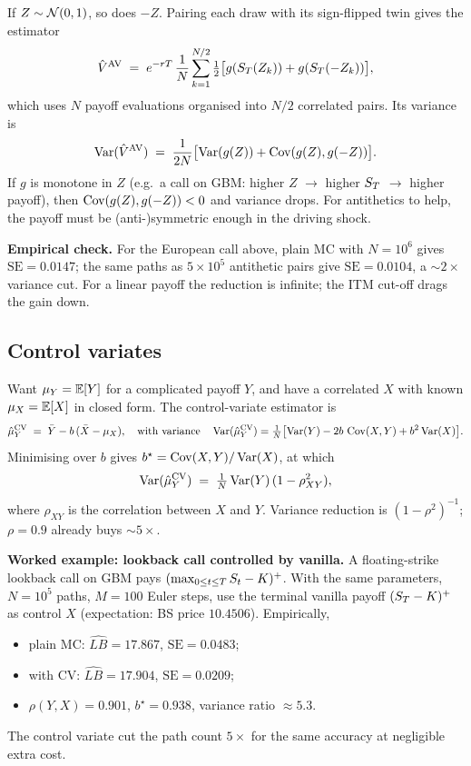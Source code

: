 If $Z \sim \mathcal{N}(0,1)$, so does $-Z$.  Pairing each draw with its
sign-flipped twin gives the estimator
\begin{equation}
  \hat V^{\mathrm{AV}}
  \;=\; e^{-rT}\,
        \frac{1}{N} \sum_{k=1}^{N/2}
        \tfrac12 \bigl[ g(S_T(Z_k)) + g(S_T(-Z_k)) \bigr],
\end{equation}
which uses $N$ payoff evaluations organised into $N/2$ correlated
pairs.  Its variance is
\begin{equation}
  \operatorname{Var}(\hat V^{\mathrm{AV}})
  \;=\; \frac{1}{2N}
        \bigl[ \operatorname{Var}(g(Z)) + \operatorname{Cov}(g(Z), g(-Z)) \bigr].
\end{equation}
If $g$ is monotone in $Z$ (e.g.\ a call on GBM: higher $Z$ $\to$
higher $S_T$ $\to$ higher payoff), then $\operatorname{Cov}(g(Z), g(-Z)) < 0$
and variance drops.  For antithetics to help, the payoff must be
(anti-)symmetric enough in the driving shock.

\textbf{Empirical check.}  For the European call above, plain MC with
$N = 10^6$ gives $\mathrm{SE} = 0.0147$; the same paths as $5\times
10^5$ antithetic pairs give $\mathrm{SE} = 0.0104$, a $\sim 2\times$
variance cut.  For a linear payoff the reduction is infinite; the
ITM cut-off drags the gain down.

\subsection{Control variates}

Want $\mu_Y = \mathbb{E}[Y]$ for a complicated payoff $Y$, and have a
correlated $X$ with known $\mu_X = \mathbb{E}[X]$ in closed form.  The
control-variate estimator is
\begin{equation}
\label{eq:cv_estimator}
  \hat\mu_Y^{\mathrm{CV}}
  \;=\; \bar Y - b\,(\bar X - \mu_X),
  \quad \text{with variance}\quad
  \operatorname{Var}(\hat\mu_Y^{\mathrm{CV}})
  = \tfrac1N \bigl[ \operatorname{Var}(Y) - 2b\,\operatorname{Cov}(X,Y) + b^2 \operatorname{Var}(X) \bigr].
\end{equation}
Minimising over $b$ gives $b^\star = \operatorname{Cov}(X,Y)/\operatorname{Var}(X)$, at which
\begin{equation}
  \operatorname{Var}(\hat\mu_Y^{\mathrm{CV}})
  \;=\; \tfrac1N \operatorname{Var}(Y) \,(1 - \rho_{XY}^2),
\end{equation}
where $\rho_{XY}$ is the correlation between $X$ and $Y$.  Variance
reduction is $(1-\rho^2)^{-1}$; $\rho = 0.9$ already buys $\sim
5\times$.

\textbf{Worked example: lookback call controlled by vanilla.}
A floating-strike lookback call on GBM pays $(\max_{0\le t\le
T}S_t - K)^+$.  With the same parameters, $N=10^5$ paths,
$M=100$ Euler steps, use the terminal vanilla payoff $(S_T -
K)^+$ as control $X$ (expectation: BS price $10.4506$).
Empirically,
\begin{itemize}
  \item plain MC: $\widehat{LB} = 17.867$, $\mathrm{SE} = 0.0483$;
  \item with CV: $\widehat{LB} = 17.904$, $\mathrm{SE} = 0.0209$;
  \item $\rho(Y,X) = 0.901$, $b^\star = 0.938$, variance ratio
    $\approx 5.3$.
\end{itemize}
The control variate cut the path count $5\times$ for the same
accuracy at negligible extra cost.

